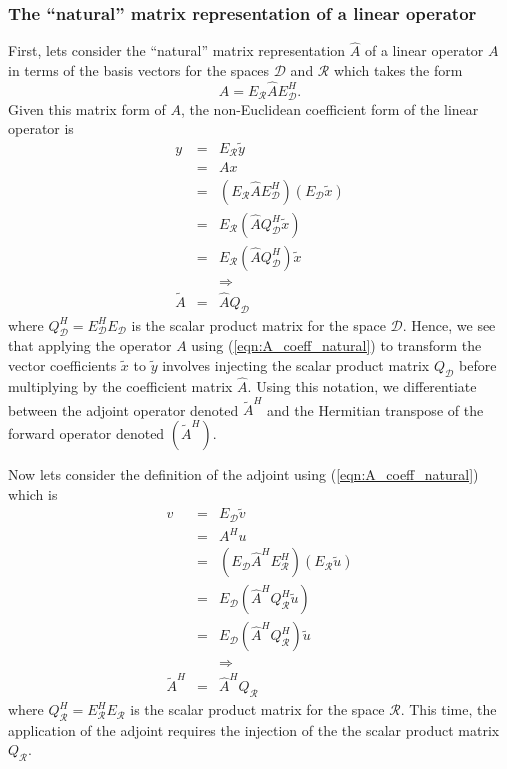 \subsubsection{The ``natural'' matrix representation of a linear operator}

First, lets consider the ``natural'' matrix representation $\hat{A}$ of a
linear operator $A$ in terms of the basis vectors for the spaces $\mathcal{D}$
and $\mathcal{R}$ which takes the form
%
\begin{equation}
A = E_{\mathcal{R}} \hat{A} E_{\mathcal{D}}^H.
\label{eqn:A_coeff_natural}
\end{equation}
%
Given this matrix form of $A$, the non-Euclidean coefficient form of the
linear operator is
%
\begin{eqnarray}
y
& = & E_{\mathcal{R}} \tilde{y} \nonumber \\
& = & A x \nonumber \\
& = & ( E_{\mathcal{R}} \hat{A} E_{\mathcal{D}}^H ) ( E_{\mathcal{D}} \tilde{x} ) \nonumber \\
& = & E_{\mathcal{R}} ( \hat{A} Q_{\mathcal{D}}^H \tilde{x} ) \nonumber \\
& = & E_{\mathcal{R}} ( \hat{A} Q_{\mathcal{D}}^H ) \tilde{x} \nonumber \\
&  & \Rightarrow \nonumber \\
\tilde{A} & = & \hat{A} Q_{\mathcal{D}}
\label{eqn:A_natural_apply}
\end{eqnarray}
%
where $Q_{\mathcal{D}}^H = E_{\mathcal{D}}^H E_{\mathcal{D}}$ is the scalar
product matrix for the space $\mathcal{D}$.  Hence, we see that applying the
operator $A$ using (\ref{eqn:A_coeff_natural}) to transform the vector
coefficients $\tilde{x}$ to $\tilde{y}$ involves injecting the scalar product
matrix $Q_{\mathcal{D}}$ before multiplying by the coefficient matrix
$\hat{A}$.  Using this notation, we differentiate between the adjoint operator
denoted $\tilde{A}^H$ and the Hermitian transpose of the forward operator
denoted $(\tilde{A}^H)$.

Now lets consider the definition of the adjoint using (\ref{eqn:A_coeff_natural}) which is
%
\begin{eqnarray}
v
& = & E_{\mathcal{D}} \tilde{v} \nonumber \\
& = & A^H u \nonumber \\
& = & ( E_{\mathcal{D}} \hat{A}^H E_{\mathcal{R}}^H ) ( E_{\mathcal{R}} \tilde{u} ) \nonumber \\
& = & E_{\mathcal{D}} ( \hat{A}^H Q_{\mathcal{R}}^H \tilde{u} ) \nonumber \\
& = & E_{\mathcal{D}} ( \hat{A}^H Q_{\mathcal{R}}^H ) \tilde{u} \nonumber \\
&  & \Rightarrow \nonumber \\
\tilde{A}^H & = & \hat{A}^H Q_{\mathcal{R}}
\label{eqn:A_natural_apply_adjoint}
\end{eqnarray}
%
where $Q_{\mathcal{R}}^H = E_{\mathcal{R}}^H E_{\mathcal{R}}$ is the scalar
product matrix for the space $\mathcal{R}$.  This time, the application of the
adjoint requires the injection of the the scalar product matrix
$Q_{\mathcal{R}}$.

